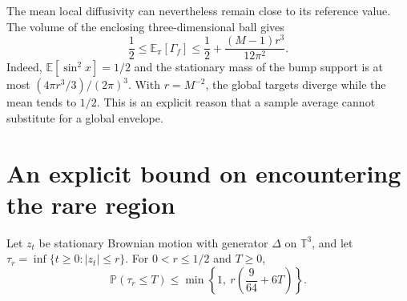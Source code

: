 The mean local diffusivity can nevertheless remain close to its reference
value. The volume of the enclosing three-dimensional ball gives
\begin{equation}
 \frac12\leq\mathbb E_\pi[\Gamma_f]
 \leq\frac12+\frac{(M-1)r^3}{12\pi^2}.
 \label{eq:dc-mean-gamma}
\end{equation}
Indeed, $\mathbb E[\sin^2x]=1/2$ and the stationary mass of the bump
support is at most $(4\pi r^3/3)/(2\pi)^3$. With $r=M^{-2}$,
the global targets diverge while the mean tends to $1/2$. This is an
explicit reason that a sample average cannot substitute for a global
envelope.

\section{An explicit bound on encountering the rare region}

\begin{lemma}
\label{lem:dc-hitting}
Let $z_t$ be stationary Brownian motion with generator $\Delta$ on
$\mathbb T^3$, and let
$\tau_r=\inf\{t\geq0:|z_t|\leq r\}$. For $0<r\leq1/2$ and $T\geq0$,
\begin{equation}
 \mathbb P(\tau_r\leq T)
 \leq\min\left\{1,\ r\left(\frac9{64}+6T\right)\right\}.
 \label{eq:dc-hitting-bound}
\end{equation}
\end{lemma}

